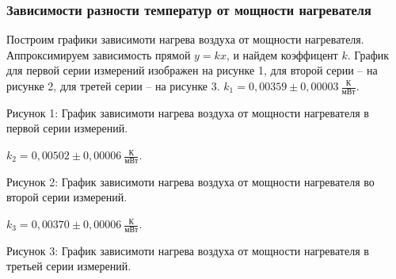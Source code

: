 \documentclass[a4paper,11pt]{article}
\begin{document}
\subsubsection{Зависимости разности температур от мощности нагревателя}
Построим графики зависимоти нагрева воздуха от мощности нагревателя. Аппроксимируем зависимость прямой $y=kx$, и найдем коэффицент $k$.\newline
График для первой серии измерений изображен на рисунке 1, для второй серии -- на рисунке 2, для третей серии -- на рисунке 3.\newline\newline
$k_{1} = 0,00359 \pm 0,00003\ \frac{К}{мВт}$.\newline
%
\begin{center}
\newline
Рисунок 1: График зависимоти нагрева воздуха от мощности нагревателя в первой серии измерений.\newline
\end{center}
$k_{2} = 0,00502 \pm 0,00006\ \frac{К}{мВт}$.\newline
%
\begin{center}
\newline
Рисунок 2: График зависимоти нагрева воздуха от мощности нагревателя во второй серии измерений.\newline
\end{center}
$k_{3} = 0,00370 \pm 0,00006\ \frac{К}{мВт}$.\newline
%
\begin{center}
\newline
Рисунок 3: График зависимоти нагрева воздуха от мощности нагревателя в третьей серии измерений.\newline
\end{center}
\end{document}
